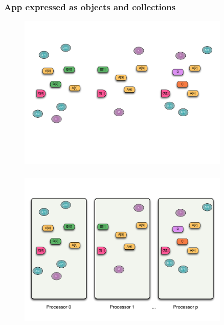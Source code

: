 \begin{frame}
  \frametitle{App expressed as objects and collections}
  \begin{figure}\includegraphics[width=0.9\textwidth]{../figures/progmodel/05-parallelism-via-obj-collections.pdf}\end{figure}
\end{frame}


\begin{frame}
  \frametitle{
  }
  \begin{figure}\includegraphics[width=0.9\textwidth]{../figures/progmodel/06-objects-sys-view.pdf}\end{figure}
\end{frame}


